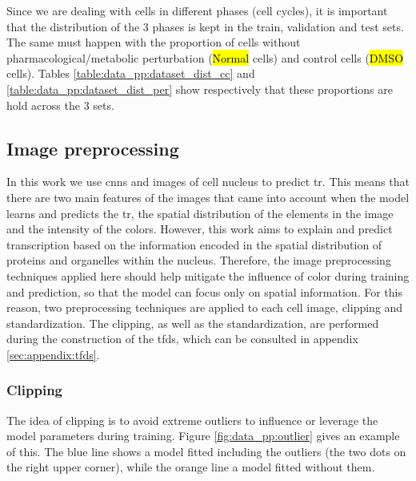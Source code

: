 Since we are dealing with cells in different phases (cell cycles), it is important that the distribution of the 3 phases is kept  in the train, validation and test sets. The same must happen with the proportion of cells without pharmacological/metabolic perturbation (\hl{Normal} cells) and control cells (\hl{DMSO} cells). Tables \ref{table:data_pp:dataset_dist_cc} and \ref{table:data_pp:dataset_dist_per} show respectively that these proportions are hold across the 3 sets.

\subsection{Image preprocessing}

In this work we use \glspl{cnn} and images of cell nucleus to predict \gls{tr}. This means that there are two main features of the images that came into account when the model learns and predicts the \gls{tr}, the spatial distribution of the elements in the image and the intensity of the colors.
However, this work aims to explain and predict transcription based on the information encoded in the spatial distribution of proteins and organelles within the nucleus. Therefore, the image preprocessing techniques applied here should help mitigate the influence of color during training and prediction, so that the model can focus only on spatial information. For this reason, two preprocessing techniques are applied to each cell image, clipping and standardization. The clipping, as well as the standardization, are performed during the construction of the \gls{tfds}, which can be consulted in appendix \ref{sec:appendix:tfds}.

\subsubsection{Clipping}

The idea of clipping is to avoid extreme outliers to influence or leverage the model parameters during training. Figure \ref{fig:data_pp:outlier} gives an example of this. The blue line shows a model fitted including the outliers (the two dots on the right upper corner), while the orange line a model fitted without them.

